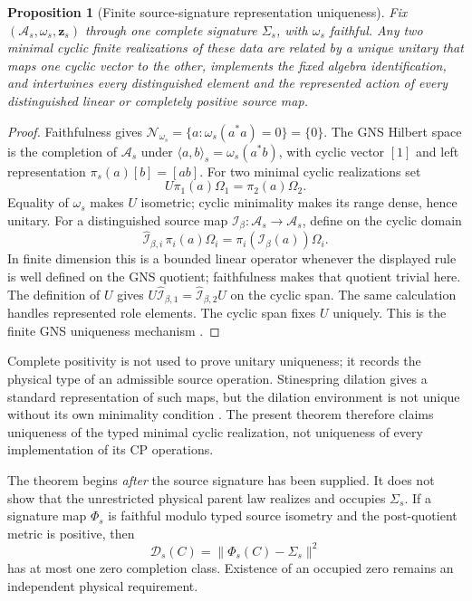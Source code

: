 \documentclass[11pt]{article}
\newtheorem{proposition}{Proposition}
\begin{document}
\begin{proposition}[Finite source-signature representation uniqueness]
Fix \((\mathcal A_s,\omega_s,\mathbf z_s)\) through one complete signature
\(\Sigma_s\), with \(\omega_s\) faithful.  Any two minimal cyclic finite
realizations of these data are related by a unique unitary that maps one cyclic
vector to the other, implements the fixed algebra identification, and
intertwines every distinguished element and the represented action of every
distinguished linear or completely positive source map.
\end{proposition}
\begin{proof}
Faithfulness gives
\(\mathcal N_{\omega_s}=\{a:\omega_s(a^*a)=0\}=\{0\}\).  The GNS Hilbert space
is the completion of \(\mathcal A_s\) under
\(\langle a,b\rangle_s=\omega_s(a^*b)\), with cyclic vector \([1]\) and left
representation \(\pi_s(a)[b]=[ab]\).  For two minimal cyclic realizations set
\begin{equation}
 U\pi_1(a)\Omega_1=\pi_2(a)\Omega_2.
\end{equation}
Equality of \(\omega_s\) makes \(U\) isometric; cyclic minimality makes its
range dense, hence unitary.  For a distinguished source map
\(\mathcal I_\beta:\mathcal A_s\to\mathcal A_s\), define on the cyclic
domain
\begin{equation}
 \widehat{\mathcal I}_{\beta,i}\,\pi_i(a)\Omega_i
 =\pi_i(\mathcal I_\beta(a))\Omega_i.
 \label{eq:represented-source-map}
\end{equation}
In finite dimension this is a bounded linear operator whenever the displayed
rule is well defined on the GNS quotient; faithfulness makes that quotient
trivial here.  The definition of \(U\) gives
\(U\widehat{\mathcal I}_{\beta,1}
=\widehat{\mathcal I}_{\beta,2}U\) on the cyclic span.  The same calculation
handles represented role elements.  The cyclic span fixes \(U\) uniquely.
This is the
finite GNS uniqueness mechanism \cite{Segal1947}.
\end{proof}

Complete positivity is not used to prove unitary uniqueness; it records the
physical type of an admissible source operation.  Stinespring dilation gives a
standard representation of such maps, but the dilation environment is not
unique without its own minimality condition \cite{Stinespring1955}.  The
present theorem therefore claims uniqueness of the typed minimal cyclic
realization, not uniqueness of every implementation of its CP operations.

The theorem begins \emph{after} the source signature has been supplied.  It
does not show that the unrestricted physical parent law realizes and occupies
\(\Sigma_s\).  If a signature map
\(\Phi_s\) is faithful modulo typed source isometry and the post-quotient
metric is positive, then
\begin{equation}
 \mathcal D_s(C)=\lVert\Phi_s(C)-\Sigma_s\rVert^2
 \label{eq:signature-defect}
\end{equation}
has at most one zero completion class.  Existence of an occupied zero remains
an independent physical requirement.
\end{document}
